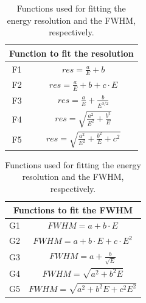 \begin{table}[h]
    \begin{subtable}
        \centering
        \begin{tabular}{|c|c|}
        \hline
        \multicolumn{2}{|c|}{Function to fit the resolution}\\
        \hline
        F1 & $ res = \frac{a}{E} + b$\\
        F2 & $ res = \frac{a}{E} + b + c \cdot E $ \\
        F3 & $ res = \frac{a}{E} + \frac{b}{E^{3/2}}$\\
        F4 & $ res = \sqrt{\frac{a^2}{E^2}+\frac{b^2}{E}}$\\
        F5 & $ res = \sqrt{\frac{a^2}{E^2}+\frac{b^2}{E}+c^2}$\\
        \hline
        \end{tabular}
    \end{subtable}
    \qquad
    \qquad
    \qquad
    \begin{subtable}
        \centering
        \begin{tabular}{|c|c|}
        \hline
        \multicolumn{2}{|c|}{Functions to fit the FWHM}\\
        \hline
        G1 & $ FWHM = a + b \cdot E$\\
        G2 & $ FWHM = a+ b \cdot E + c \cdot E^{2} $ \\
        G3 & $ FWHM = a + \frac{b}{\sqrt{E}}$\\
        G4 & $ FWHM = \sqrt{a^2+b^2 E} $\\
        G5 & $ FWHM = \sqrt{a^2+b^2E+c^2E^2}$\\
       \hline
        \end{tabular}
     \end{subtable}
     \caption{Functions used for fitting the energy resolution and the FWHM, respectively.}
     \label{table:Funzioni}
\end{table}

